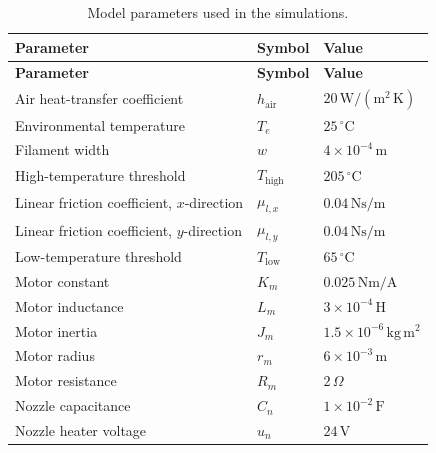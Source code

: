 \documentclass[11pt,a4paper]{article}
\begin{document}
\begin{longtable}{lll}
\caption{Model parameters used in the simulations.}
\label{tab:parameters}\\

\textbf{Parameter} & \textbf{Symbol} & \textbf{Value} \\ \hline
\endfirsthead

\textbf{Parameter} & \textbf{Symbol} & \textbf{Value} \\ \hline
\endhead

Air heat-transfer coefficient
& \(h_{\mathrm{air}}\)
& \(20\,\mathrm{W/(m^2\,K)}\) \\

Environmental temperature
& \(T_e\)
& \(25\,^\circ\mathrm{C}\) \\

Filament width
& \(w\)
& \(4\times10^{-4}\,\mathrm{m}\) \\

High-temperature threshold
& \(T_{\mathrm{high}}\)
& \(205\,^\circ\mathrm{C}\) \\

Linear friction coefficient, \(x\)-direction
& \(\mu_{l,x}\)
& \(0.04\,\mathrm{Ns/m}\) \\

Linear friction coefficient, \(y\)-direction
& \(\mu_{l,y}\)
& \(0.04\,\mathrm{Ns/m}\) \\

Low-temperature threshold
& \(T_{\mathrm{low}}\)
& \(65\,^\circ\mathrm{C}\) \\

Motor constant
& \(K_m\)
& \(0.025\,\mathrm{Nm/A}\) \\

Motor inductance
& \(L_m\)
& \(3\times10^{-4}\,\mathrm{H}\) \\

Motor inertia
& \(J_m\)
& \(1.5\times10^{-6}\,\mathrm{kg\,m^2}\) \\

Motor radius
& \(r_m\)
& \(6\times10^{-3}\,\mathrm{m}\) \\

Motor resistance
& \(R_m\)
& \(2\,\Omega\) \\

Nozzle capacitance
& \(C_n\)
& \(1\times10^{-2}\,\mathrm{F}\) \\

Nozzle heater voltage
& \(u_n\)
& \(24\,\mathrm{V}\) \\


\end{longtable}
\end{document}
